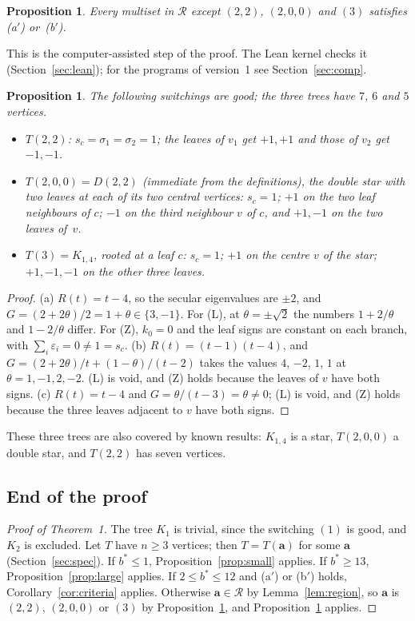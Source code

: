 \documentclass[11pt]{article}
\numberwithin{equation}{section}
\newtheorem{proposition}[lemma]{Proposition}
\theoremstyle{remark}
\newcommand{\cR}{\mathcal R}
\newcommand{\bfa}{\mathbf a}
\begin{document}
\begin{proposition}\label{prop:search}
Every multiset in $\cR$ except $(2,2)$, $(2,0,0)$ and $(3)$ satisfies (a$'$)
or~(b$'$).
\end{proposition}

This is the computer-assisted step of the proof. The Lean kernel checks it
(Section~\ref{sec:lean}); for the programs of version~1 see
Section~\ref{sec:comp}.

\begin{proposition}\label{prop:three}
The following switchings are good; the three trees have $7$, $6$ and $5$
vertices.
\begin{itemize}
\item[(a)] $T(2,2)$: $s_c=\sigma_1=\sigma_2=1$; the leaves of $v_1$ get $+1,+1$
 and those of $v_2$ get $-1,-1$.
\item[(b)] $T(2,0,0)=D(2,2)$ (immediate from the definitions), the double star with two leaves at each of its
 two central vertices: $s_c=1$; $+1$ on the two leaf neighbours of $c$; $-1$ on the
 third neighbour $v$ of $c$, and $+1,-1$ on the two leaves of~$v$.
\item[(c)] $T(3)=K_{1,4}$, rooted at a leaf $c$: $s_c=1$; $+1$ on the centre $v$
 of the star; $+1,-1,-1$ on the other three leaves.
\end{itemize}
\end{proposition}
\begin{proof}
(a) $R(t)=t-4$, so the secular eigenvalues are $\pm2$, and
$G=(2+2\theta)/2=1+\theta\in\{3,-1\}$. For (L), at $\theta=\pm\sqrt2$ the
numbers $1+2/\theta$ and $1-2/\theta$ differ. For (Z), $k_0=0$ and the leaf
signs are constant on each branch, with $\sum_i\varepsilon_i=0\ne1=s_c$.
(b) $R(t)=(t-1)(t-4)$, and
$G=(2+2\theta)/t+(1-\theta)/(t-2)$ takes the values $4$, $-2$, $1$, $1$ at
$\theta=1,-1,2,-2$. (L) is void, and (Z) holds because the leaves of $v$ have
both signs. (c) $R(t)=t-4$ and $G=\theta/(t-3)=\theta\ne0$; (L) is void, and (Z)
holds because the three leaves adjacent to $v$ have both signs.
\end{proof}

These three trees are also covered by known results: $K_{1,4}$ is a star,
$T(2,0,0)$ a double star, and $T(2,2)$ has seven vertices.

\subsection{End of the proof}

\begin{proof}[Proof of Theorem~1]
The tree $K_1$ is trivial, since the switching $(1)$ is good, and $K_2$ is
excluded. Let $T$ have $n\ge3$ vertices; then $T=T(\bfa)$ for some $\bfa$
(Section~\ref{sec:spec}). If $b^*\le1$, Proposition~\ref{prop:small} applies. If $b^*\ge13$,
Proposition~\ref{prop:large} applies. If $2\le b^*\le12$ and (a$'$) or (b$'$)
holds, Corollary~\ref{cor:criteria} applies. Otherwise $\bfa\in\cR$ by
Lemma~\ref{lem:region}, so $\bfa$ is $(2,2)$, $(2,0,0)$ or $(3)$ by
Proposition~\ref{prop:search}, and Proposition~\ref{prop:three} applies.
\end{proof}
\end{document}
